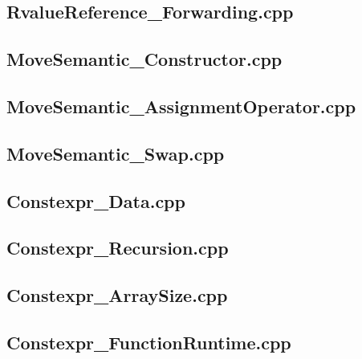 \documentclass[11pt]{report}
\begin{document}
\begin{appendix}
\subsection{RvalueReference\_Forwarding.cpp}
\label{RvalueReference_Forwarding}


\subsection{MoveSemantic\_Constructor.cpp}
\label{MoveSemantic_Constructor}


\subsection{MoveSemantic\_AssignmentOperator.cpp}
\label{MoveSemantic_AssignmentOperator}


\subsection{MoveSemantic\_Swap.cpp}
\label{MoveSemantic_Swap}


\subsection{Constexpr\_Data.cpp}
\label{Constexpr_Data}


\subsection{Constexpr\_Recursion.cpp}
\label{Constexpr_Recursion}


\subsection{Constexpr\_ArraySize.cpp}
\label{Constexpr_ArraySize}


\subsection{Constexpr\_FunctionRuntime.cpp}
\label{Constexpr_FunctionRuntime}



\end{appendix}
\end{document}
